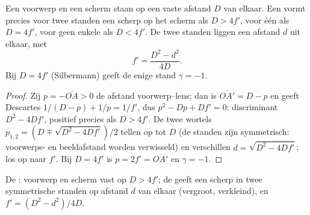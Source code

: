 \begin{proposition}\label{prop:b1:mirrors-thin-lenses:bessel}
Een voorwerp en een scherm staan op een vaste afstand $D$ van elkaar. Een
 vormt precies voor twee standen een scherp  op
het scherm als $D > 4f'$, voor één als $D = 4f'$, voor geen enkele als
$D < 4f'$. De twee standen liggen een afstand $d$ uit elkaar, met
\[
f' = \frac{D^2 - d^2}{4D} .
\]
Bij $D = 4f'$ (Silbermann) geeft de enige stand $\gamma = -1$.
\end{proposition}

\begin{proof}
Zij $p = -\overline{OA} > 0$ de afstand voorwerp--lens; dan is
$\overline{OA'} = D - p$ en geeft Descartes $1/(D - p) + 1/p = 1/f'$,
dus $p^2 - Dp + Df' = 0$: discriminant $D^2 - 4Df'$, positief precies als
$D > 4f'$. De twee wortels $p_{1,2} = (D \mp \sqrt{D^2 - 4Df'})/2$ tellen op
tot $D$ (de standen zijn symmetrisch: voorwerps- en beeldafstand worden
verwisseld) en verschillen $d = \sqrt{D^2 - 4Df'}$; los op naar $f'$. Bij
$D = 4f'$ is $p = 2f' = \overline{OA'}$ en $\gamma = -1$.
\end{proof}

\begin{omfigure}

{\small De : voorwerp en scherm vast op $D > 4f'$; de 
geeft een scherp  in twee symmetrische standen op afstand $d$ van elkaar
(vergroot, verkleind), en $f' = (D^2 - d^2)/4D$.}
\end{omfigure}


